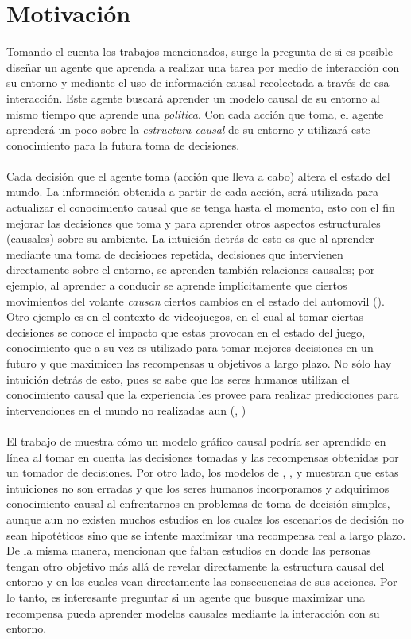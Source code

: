 \documentclass[11pt]{article}
\theoremstyle{plain}
\begin{document}
\section{Motivación}
Tomando el cuenta los trabajos mencionados, surge la pregunta de si es posible diseñar un agente que aprenda a realizar una tarea por medio de interacción con su entorno y mediante el uso de información causal recolectada a través de esa interacción. Este agente buscará aprender un modelo causal de su entorno al mismo tiempo que aprende una \textit{política}. Con cada acción que toma, el agente aprenderá  un poco sobre la \textit{estructura causal} de su entorno y utilizará este conocimiento para la futura toma de decisiones.\\
\\
Cada decisión que el agente toma (acción que lleva a cabo) altera el estado del mundo. La información obtenida a partir de cada acción, será utilizada para actualizar el conocimiento causal que se tenga hasta el momento, esto con el fin mejorar las decisiones que toma y para aprender otros aspectos estructurales (causales) sobre su ambiente. La intuición detrás de esto es que al aprender mediante una toma de decisiones repetida, decisiones que intervienen directamente sobre el entorno, se aprenden también relaciones causales; por ejemplo, al aprender a conducir se aprende implícitamente que ciertos movimientos del volante \textit{causan} ciertos cambios en el estado del automovil (\cite{danks2014unifying}). Otro ejemplo es en el contexto de videojuegos, en el cual al tomar ciertas decisiones se conoce el impacto que estas provocan en el estado del juego, conocimiento que a su vez es utilizado para tomar mejores decisiones en un futuro y que maximicen las recompensas u objetivos a largo plazo. No sólo hay intuición detrás de esto, pues se sabe que los seres humanos utilizan el conocimiento causal que la experiencia les provee para realizar predicciones para intervenciones en el mundo no realizadas aun (\cite{meder2008inferring}, \cite{hagmayer2009decision})\\
\\
El trabajo de \cite{wellen2012learning} muestra cómo un modelo gráfico causal podría ser aprendido en línea al tomar en cuenta las decisiones tomadas y las recompensas obtenidas por un tomador de decisiones. Por otro lado, los modelos de \cite{sloman2006causal}, \cite{meder2008inferring}, \cite{hagmayer2009decision} y \cite{hagmayer2013repeated} muestran que estas intuiciones no son erradas y que los seres humanos incorporamos y adquirimos conocimiento causal al enfrentarnos en problemas de toma de decisión simples, aunque aun no existen muchos estudios en los cuales los escenarios de decisión no sean hipotéticos sino que se intente maximizar una recompensa real a largo plazo. De la misma manera, \cite{hagmayer2013repeated} mencionan que faltan estudios en donde las personas tengan otro objetivo más allá de revelar directamente la estructura causal del entorno y en los cuales vean directamente las consecuencias de sus acciones. Por lo tanto, es interesante preguntar si un agente que busque maximizar una recompensa pueda aprender modelos causales mediante la interacción con su entorno.
\end{document}
